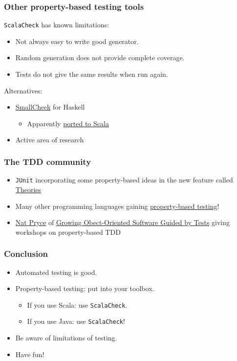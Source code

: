 \documentclass{beamer}
\begin{document}
\begin{frame}
  \frametitle{Other property-based testing tools}

  \texttt{ScalaCheck} has known limitations:
  \begin{itemize}
    \item Not always easy to write good generator.
    \item Random generation does not provide complete coverage.
    \item Tests do not give the same results when run again.
  \end{itemize}

  Alternatives:
  \begin{itemize}
    \item \href{http://www.cs.york.ac.uk/fp/smallcheck/}{SmallCheck} for Haskell
      \begin{itemize}
        \item Apparently \href{https://github.com/dwhjames/smallcheck4scala}{ported to Scala}
      \end{itemize}
    \item Active area of research
  \end{itemize}
\end{frame}

\begin{frame}
  \frametitle{The TDD community}
  
  \begin{itemize}
    \item \texttt{JUnit} incorporating some property-based ideas in the new feature called \href{https://github.com/junit-team/junit/wiki/Theories}{Theories}
    \item Many other programming languages gaining \href{http://en.wikipedia.org/wiki/QuickCheck}{property-based testing}!
    \item \href{http://www.natpryce.com/}{Nat Pryce} of \href{http://www.growing-object-oriented-software.com/}{Growing Obect-Oriented Software Guided by Tests} giving workshops on property-based TDD
  \end{itemize}
\end{frame}

\begin{frame}
  \frametitle{Conclusion}

  \begin{itemize}
    \item Automated testing is good.
    \item Property-based testing: put into your toolbox.
      \begin{itemize}
        \item If you use Scala: use \texttt{ScalaCheck}.
        \item If you use Java: use \texttt{ScalaCheck}!
      \end{itemize}
    \item Be aware of limitations of testing.
    \item Have fun!
  \end{itemize}
\end{frame}
\end{document}
